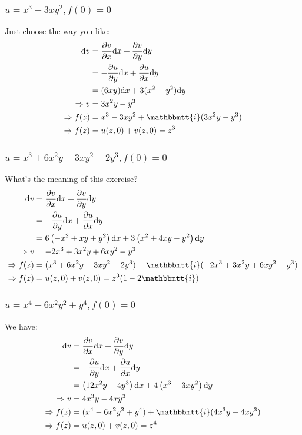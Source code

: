 \documentclass[]{ctexart}
\newcommand{\mi}{\mathbbmtt{i}}
\newcommand{\di}{\mathrm{d}}
\newcommand{\pa}{\partial}
\begin{document}
			\subsubsection{$u=x^{3}-3 x y^{2}, f(0)=0 $}
				Just choose the way you like:
					\begin{equation*}
					\begin{aligned}
						\di v&=\frac{\pa v}{\pa x}\di x+\frac{\pa v}{\pa y}\di y\\
						&=-\frac{\pa u}{\pa y}\di x+\frac{\pa u}{\pa x}\di y\\
						&=(6xy)\di x+3(x^2-y^2)\di y\\
						\Rightarrow v&=3x^2y-y^3\\
						\Rightarrow f(z)&=x^{3}-3 x y^{2}+\mi (3x^2y-y^3)\\
						\Rightarrow f(z)&=u(z,0)+v(z,0)=z^3
					\end{aligned}
					\end{equation*}
					
			\subsubsection{$u=x^{3}+6 x^{2} y-3 x y^{2}-2 y^{3}, f(0)=0$}
				What's the meaning of this exercise?
					\begin{equation*}
					\begin{aligned}
						\di v&=\frac{\pa v}{\pa x}\di x+\frac{\pa v}{\pa y}\di y\\
						&=-\frac{\pa u}{\pa y}\di x+\frac{\pa u}{\pa x}\di y\\
						&=6 \left(-x^2+x y+y^2\right)\di x+3 \left(x^2+4 x y-y^2\right)\di y\\
						\Rightarrow v&=-2x^3+3x^2y+6xy^2-y^3\\
						\Rightarrow f(z)&=(x^{3}+6 x^{2} y-3 x y^{2}-2 y^{3})+\mi (-2x^3+3x^2y+6xy^2-y^3)\\
						\Rightarrow f(z)&=u(z,0)+v(z,0)=z^3(1-2\mi)
					\end{aligned}
					\end{equation*}
			
			\subsubsection{$u=x^{4}-6 x^{2} y^{2}+y^{4}, f(0)=0$}
				We have:
					\begin{equation*}
					\begin{aligned}
						\di v&=\frac{\pa v}{\pa x}\di x+\frac{\pa v}{\pa y}\di y\\
						&=-\frac{\pa u}{\pa y}\di x+\frac{\pa u}{\pa x}\di y\\
						&=\left(12 x^2 y-4 y^3\right)\di x+4 \left(x^3-3 x y^2\right)\di y\\
						\Rightarrow v&=4x^3y-4xy^3\\
						\Rightarrow f(z)&=(x^{4}-6 x^{2} y^{2}+y^{4})+\mi (4x^3y-4xy^3)\\
						\Rightarrow f(z)&=u(z,0)+v(z,0)=z^4
					\end{aligned}
					\end{equation*}
			
\end{document}
